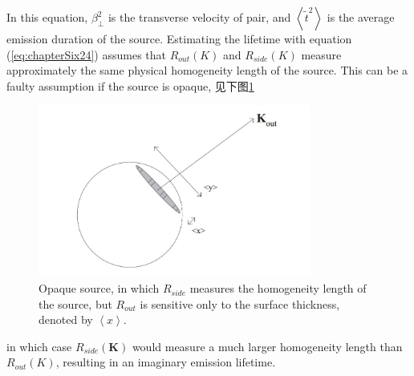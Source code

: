In this equation, $\beta_{\perp}^{2}$ is the transverse velocity of pair,%
and $\left< \widetilde{t}^{2}\right>$ is the average emission duration of the source.%
Estimating the lifetime with equation (\ref{eq:chapterSix24}) assumes that $R_{out}(K)$ and $R_{side}(K)$ measure approximately the same physical homogeneity length of the source.%
This can be a faulty assumption if the source is opaque, 见下图\ref{fig:opaque-source}
\begin{figure}[hbpt]
  \centering
  \includegraphics[width=0.8\textwidth]{./chapter06/images/opaque-source}
  \caption{Opaque source, in which $R_{side}$ measures the homogeneity length of the source, but $R_{out}$ is sensitive only to the surface thickness, denoted by $\left< x \right>$.}
  \label{fig:opaque-source}
\end{figure}
in which case $R_{side}(\textbf{K})$ would measure a much larger homogeneity length than $R_{out}(K)$,%
resulting in an imaginary emission lifetime.







